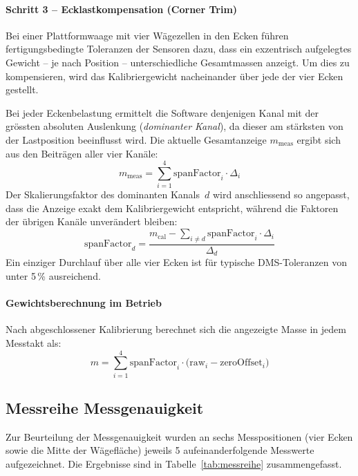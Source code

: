 \documentclass[12pt,a4paper]{article}
\begin{document}
	\paragraph{Schritt 3 -- Ecklastkompensation (Corner Trim)}
	Bei einer Plattformwaage mit vier Wägezellen in den Ecken führen fertigungsbedingte Toleranzen der Sensoren dazu, dass ein exzentrisch aufgelegtes Gewicht -- je nach Position -- unterschiedliche Gesamtmassen anzeigt.
	Um dies zu kompensieren, wird das Kalibriergewicht nacheinander über jede der vier Ecken gestellt.

	Bei jeder Eckenbelastung ermittelt die Software denjenigen Kanal mit der grössten absoluten Auslenkung (\emph{dominanter Kanal}), da dieser am stärksten von der Lastposition beeinflusst wird.
	Die aktuelle Gesamtanzeige $m_{\text{meas}}$ ergibt sich aus den Beiträgen aller vier Kanäle:
	\begin{equation}
		m_{\text{meas}} = \sum_{i=1}^{4} \text{spanFactor}_i \cdot \Delta_i
	\end{equation}
	Der Skalierungsfaktor des dominanten Kanals~$d$ wird anschliessend so angepasst, dass die Anzeige exakt dem Kalibriergewicht entspricht, während die Faktoren der übrigen Kanäle unverändert bleiben:
	\begin{equation}
		\text{spanFactor}_d = \frac{m_{\text{cal}} - \sum_{i \neq d} \text{spanFactor}_i \cdot \Delta_i}{\Delta_d}
	\end{equation}
	Ein einziger Durchlauf über alle vier Ecken ist für typische DMS-Toleranzen von unter 5\,\% ausreichend.

	\paragraph{Gewichtsberechnung im Betrieb}
	Nach abgeschlossener Kalibrierung berechnet sich die angezeigte Masse in jedem Messtakt als:
	\begin{equation}
		m = \sum_{i=1}^{4} \text{spanFactor}_i \cdot \bigl(\text{raw}_i - \text{zeroOffset}_i\bigr)
	\end{equation}

	 \subsection{Messreihe Messgenauigkeit}

	Zur Beurteilung der Messgenauigkeit wurden an sechs Messpositionen (vier Ecken sowie die Mitte der Wägefläche) jeweils 5 aufeinanderfolgende Messwerte aufgezeichnet.
	Die Ergebnisse sind in Tabelle~\ref{tab:messreihe} zusammengefasst.
\end{document}
